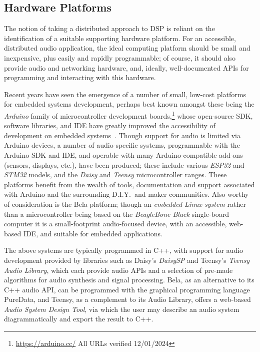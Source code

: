 \subsection{Hardware Platforms}\label{subsec:hardware-platforms}

The notion of taking a distributed approach to DSP is reliant on the
identification of a suitable supporting hardware platform.
For an accessible, distributed audio application, the ideal computing platform
should be small and inexpensive, plus easily and rapidly programmable;
of course, it should also provide audio and networking hardware, and, ideally,
well-documented APIs for programming and interacting with this hardware.

Recent years have seen the emergence of a number of small, low-cost platforms
for embedded systems development, perhaps best known amongst these being the
\textit{Arduino} family of microcontroller development boards,\footnote{
    \url{https://arduino.cc/} \textemdash{} All URLs verified 12/01/2024
}
whose open-source SDK, software libraries, and IDE have greatly improved the
accessibility of development on embedded systems~\citep{michon_embedded_2020}.
Though support for audio is limited via Arduino devices, a number of
audio-specific systems, programmable with the Arduino SDK and IDE, and
operable with many Arduino-compatible add-ons (sensors, displays, etc.), have
been produced;
these include various \textit{ESP32} and \textit{STM32} models, and the
\textit{Daisy} and \textit{Teensy} microcontroller ranges.
These platforms benefit from the wealth of tools, documentation and support
associated with Arduino and the surrounding D.I.Y.\ and maker communities.
Also worthy of consideration is the Bela platform;
though an \textit{embedded Linux system} rather than a microcontroller
\textemdash{} being based on the \textit{BeagleBone Black} single-board computer
\textemdash{} it is a small-footprint audio-focused device, with an accessible,
web-based IDE, and suitable for embedded applications.


The above systems are typically programmed in C++, with support for audio
development provided by libraries such as Daisy's \textit{DaisySP} and Teensy's
\textit{Teensy Audio Library}, which each provide audio APIs and a selection of
pre-made algorithms for audio synthesis and signal processing.
Bela, as an alternative to its C++ audio API, can be programmed with the
graphical programming language PureData, and
Teensy, as a complement to its Audio Library, offers a web-based
\textit{Audio System Design Tool}, via which the user may describe an audio
system diagrammatically and export the result to C++.


